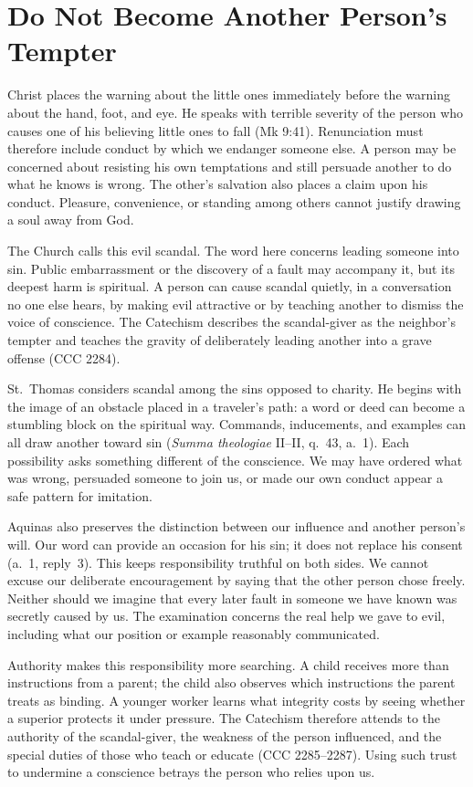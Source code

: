\section{Do Not Become Another Person's Tempter}

Christ places the warning about the little ones immediately before the warning about the hand, foot, and eye. He speaks with terrible severity of the person who causes one of his believing little ones to fall (Mk 9:41). Renunciation must therefore include conduct by which we endanger someone else. A person may be concerned about resisting his own temptations and still persuade another to do what he knows is wrong. The other's salvation also places a claim upon his conduct. Pleasure, convenience, or standing among others cannot justify drawing a soul away from God.

The Church calls this evil scandal. The word here concerns leading someone into sin. Public embarrassment or the discovery of a fault may accompany it, but its deepest harm is spiritual. A person can cause scandal quietly, in a conversation no one else hears, by making evil attractive or by teaching another to dismiss the voice of conscience. The Catechism describes the scandal-giver as the neighbor's tempter and teaches the gravity of deliberately leading another into a grave offense (CCC 2284).

St.~Thomas considers scandal among the sins opposed to charity. He begins with the image of an obstacle placed in a traveler's path: a word or deed can become a stumbling block on the spiritual way. Commands, inducements, and examples can all draw another toward sin (\emph{Summa theologiae} II--II, q.~43, a.~1). Each possibility asks something different of the conscience. We may have ordered what was wrong, persuaded someone to join us, or made our own conduct appear a safe pattern for imitation.

Aquinas also preserves the distinction between our influence and another person's will. Our word can provide an occasion for his sin; it does not replace his consent (a.~1, reply~3). This keeps responsibility truthful on both sides. We cannot excuse our deliberate encouragement by saying that the other person chose freely. Neither should we imagine that every later fault in someone we have known was secretly caused by us. The examination concerns the real help we gave to evil, including what our position or example reasonably communicated.

Authority makes this responsibility more searching. A child receives more than instructions from a parent; the child also observes which instructions the parent treats as binding. A younger worker learns what integrity costs by seeing whether a superior protects it under pressure. The Catechism therefore attends to the authority of the scandal-giver, the weakness of the person influenced, and the special duties of those who teach or educate (CCC 2285--2287). Using such trust to undermine a conscience betrays the person who relies upon us.

